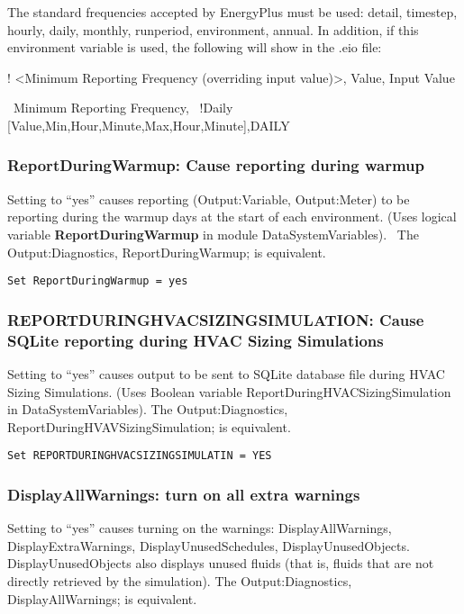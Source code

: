 The standard frequencies accepted by EnergyPlus must be used: detail, timestep, hourly, daily, monthly, runperiod, environment, annual. In addition, if this environment variable is used, the following will show in the .eio file:

! \textless{}Minimum Reporting Frequency (overriding input value)\textgreater{}, Value, Input Value

~Minimum Reporting Frequency,~ !Daily {[}Value,Min,Hour,Minute,Max,Hour,Minute{]},DAILY

\subsubsection{ReportDuringWarmup: Cause reporting during warmup}\label{reportduringwarmup-cause-reporting-during-warmup}

Setting to ``yes'' causes reporting (Output:Variable, Output:Meter) to be reporting during the warmup days at the start of each environment. (Uses logical variable \textbf{ReportDuringWarmup} in module DataSystemVariables).~ The Output:Diagnostics, ReportDuringWarmup; is equivalent.

\begin{lstlisting}
Set ReportDuringWarmup = yes
\end{lstlisting}

\subsubsection{REPORTDURINGHVACSIZINGSIMULATION: Cause SQLite reporting during HVAC Sizing Simulations}\label{reportduringhvacsizingsimulation-cause-sqlite-reporting-during-hvac-sizing-simulations}

Setting to ``yes'' causes output to be sent to SQLite database file during HVAC Sizing Simulations. (Uses Boolean variable ReportDuringHVACSizingSimulation in DataSystemVariables). The Output:Diagnostics, ReportDuringHVAVSizingSimulation; is equivalent.

\begin{lstlisting}
Set REPORTDURINGHVACSIZINGSIMULATIN = YES
\end{lstlisting}

\subsubsection{DisplayAllWarnings: turn on all extra warnings}\label{displayallwarnings-turn-on-all-extra-warnings}

Setting to ``yes'' causes turning on the warnings: DisplayAllWarnings, DisplayExtraWarnings, DisplayUnusedSchedules, DisplayUnusedObjects. DisplayUnusedObjects also displays unused fluids (that is, fluids that are not directly retrieved by the simulation). The Output:Diagnostics, DisplayAllWarnings; is equivalent.

